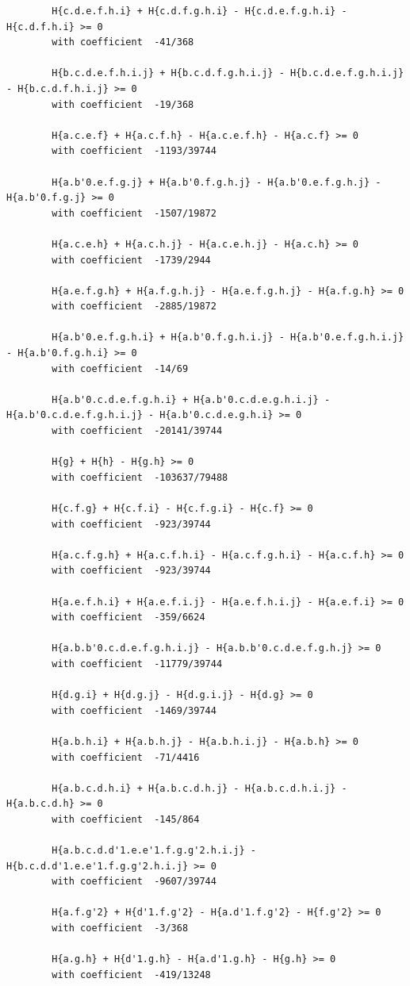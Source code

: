 \documentclass[11pt, a4paper]{kybernetika}
\begin{document}
\begin{verbatim}
		H{c.d.e.f.h.i} + H{c.d.f.g.h.i} - H{c.d.e.f.g.h.i} - H{c.d.f.h.i} >= 0
		with coefficient  -41/368
		
		H{b.c.d.e.f.h.i.j} + H{b.c.d.f.g.h.i.j} - H{b.c.d.e.f.g.h.i.j} - H{b.c.d.f.h.i.j} >= 0
		with coefficient  -19/368
		
		H{a.c.e.f} + H{a.c.f.h} - H{a.c.e.f.h} - H{a.c.f} >= 0
		with coefficient  -1193/39744
		
		H{a.b'0.e.f.g.j} + H{a.b'0.f.g.h.j} - H{a.b'0.e.f.g.h.j} - H{a.b'0.f.g.j} >= 0
		with coefficient  -1507/19872
		
		H{a.c.e.h} + H{a.c.h.j} - H{a.c.e.h.j} - H{a.c.h} >= 0
		with coefficient  -1739/2944
		
		H{a.e.f.g.h} + H{a.f.g.h.j} - H{a.e.f.g.h.j} - H{a.f.g.h} >= 0
		with coefficient  -2885/19872
		
		H{a.b'0.e.f.g.h.i} + H{a.b'0.f.g.h.i.j} - H{a.b'0.e.f.g.h.i.j} - H{a.b'0.f.g.h.i} >= 0
		with coefficient  -14/69
		
		H{a.b'0.c.d.e.f.g.h.i} + H{a.b'0.c.d.e.g.h.i.j} - H{a.b'0.c.d.e.f.g.h.i.j} - H{a.b'0.c.d.e.g.h.i} >= 0
		with coefficient  -20141/39744
		
		H{g} + H{h} - H{g.h} >= 0
		with coefficient  -103637/79488
		
		H{c.f.g} + H{c.f.i} - H{c.f.g.i} - H{c.f} >= 0
		with coefficient  -923/39744
		
		H{a.c.f.g.h} + H{a.c.f.h.i} - H{a.c.f.g.h.i} - H{a.c.f.h} >= 0
		with coefficient  -923/39744
		
		H{a.e.f.h.i} + H{a.e.f.i.j} - H{a.e.f.h.i.j} - H{a.e.f.i} >= 0
		with coefficient  -359/6624
		
		H{a.b.b'0.c.d.e.f.g.h.i.j} - H{a.b.b'0.c.d.e.f.g.h.j} >= 0
		with coefficient  -11779/39744
		
		H{d.g.i} + H{d.g.j} - H{d.g.i.j} - H{d.g} >= 0
		with coefficient  -1469/39744
		
		H{a.b.h.i} + H{a.b.h.j} - H{a.b.h.i.j} - H{a.b.h} >= 0
		with coefficient  -71/4416
		
		H{a.b.c.d.h.i} + H{a.b.c.d.h.j} - H{a.b.c.d.h.i.j} - H{a.b.c.d.h} >= 0
		with coefficient  -145/864
		
		H{a.b.c.d.d'1.e.e'1.f.g.g'2.h.i.j} - H{b.c.d.d'1.e.e'1.f.g.g'2.h.i.j} >= 0
		with coefficient  -9607/39744
		
		H{a.f.g'2} + H{d'1.f.g'2} - H{a.d'1.f.g'2} - H{f.g'2} >= 0
		with coefficient  -3/368
		
		H{a.g.h} + H{d'1.g.h} - H{a.d'1.g.h} - H{g.h} >= 0
		with coefficient  -419/13248
		

\end{verbatim}
\end{document}
